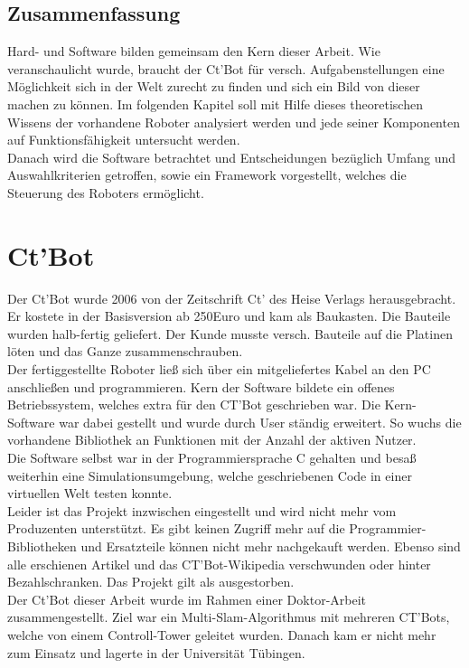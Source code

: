 \documentclass[twoside,12pt,a4paper]{report}
\begin{document}
	
	\section{Zusammenfassung}
	Hard- und Software bilden gemeinsam den Kern dieser Arbeit. Wie veranschaulicht wurde, braucht der Ct'Bot für versch. Aufgabenstellungen eine Möglichkeit sich in der Welt zurecht zu finden und sich ein Bild von dieser machen zu können. Im folgenden Kapitel soll mit Hilfe dieses theoretischen Wissens der vorhandene Roboter analysiert werden und jede seiner Komponenten auf Funktionsfähigkeit untersucht werden. \\
	Danach wird die Software betrachtet und Entscheidungen bezüglich Umfang und Auswahlkriterien getroffen, sowie ein Framework vorgestellt, welches die Steuerung des Roboters ermöglicht. 
	
	
	
	
	
	
	
	
	
	\chapter{Ct'Bot}
	Der Ct'Bot wurde 2006 von der Zeitschrift Ct' des Heise Verlags herausgebracht. Er kostete in der Basisversion ab 250Euro und kam als Baukasten. Die Bauteile wurden halb-fertig geliefert. Der Kunde musste versch. Bauteile auf die Platinen löten und das Ganze zusammenschrauben. \\
	Der fertiggestellte Roboter ließ sich über ein mitgeliefertes Kabel an den PC anschließen und programmieren. Kern der Software bildete ein offenes Betriebssystem, welches extra für den CT'Bot geschrieben war. Die Kern-Software war dabei gestellt und wurde durch User ständig erweitert. So wuchs die vorhandene Bibliothek an Funktionen mit der Anzahl der aktiven Nutzer. \\
	Die Software selbst war in der Programmiersprache C gehalten und besaß weiterhin eine Simulationsumgebung, welche geschriebenen Code in einer virtuellen Welt testen konnte. \\
	Leider ist das Projekt inzwischen eingestellt und wird nicht mehr vom Produzenten unterstützt. Es gibt keinen Zugriff mehr auf die Programmier-Bibliotheken und Ersatzteile können nicht mehr nachgekauft werden. Ebenso sind alle erschienen Artikel und das CT'Bot-Wikipedia verschwunden oder hinter Bezahlschranken. Das Projekt gilt als ausgestorben. \\
	Der Ct'Bot dieser Arbeit wurde im Rahmen einer Doktor-Arbeit zusammengestellt. Ziel war ein Multi-Slam-Algorithmus mit mehreren CT'Bots, welche von einem Controll-Tower geleitet wurden. Danach kam er nicht mehr zum Einsatz und lagerte in der Universität Tübingen. 
	
\end{document}
